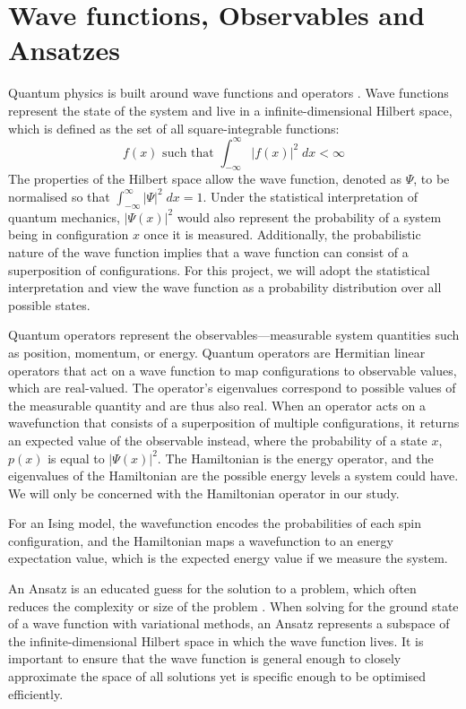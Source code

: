 \section{Wave functions, Observables and Ansatzes}\label{wavefunction}
Quantum physics is built around wave functions and operators \cite{GriffithsSchroeter2018}. Wave functions represent the state of the system and live in a infinite-dimensional Hilbert space, which is defined as the set of all square-integrable functions:
\begin{equation*}
    f(x) \text{ such that } \int_{-\infty}^\infty |f(x)|^2 \; dx < \infty
\end{equation*}
The properties of the Hilbert space allow the wave function, denoted as $\Psi$, to be normalised so that $\int_{-\infty}^\infty |\Psi|^2 \; dx = 1$. Under the statistical interpretation of quantum mechanics, $|\Psi(x)|^2$ would also represent the probability of a system being in configuration $x$ once it is measured. Additionally, the probabilistic nature of the wave function implies that a wave function can consist of a superposition of configurations. For this project, we will adopt the statistical interpretation and view the wave function as a probability distribution over all possible states.

Quantum operators represent the observables---measurable system quantities such as position, momentum, or energy. Quantum operators are Hermitian linear operators that act on a wave function to map configurations to observable values, which are real-valued. The operator's eigenvalues correspond to possible values of the measurable quantity and are thus also real. When an operator acts on a wavefunction that consists of a superposition of multiple configurations, it returns an expected value of the observable instead, where the probability of a state $x$, $p(x)$ is equal to $|\Psi (x)|^2$. The Hamiltonian is the energy operator, and the eigenvalues of the Hamiltonian are the possible energy levels a system could have. We will only be concerned with the Hamiltonian operator in our study.

For an Ising model, the wavefunction encodes the probabilities of each spin configuration, and the Hamiltonian maps a wavefunction to an energy expectation value, which is the expected energy value if we measure the system.

An Ansatz is an educated guess for the solution to a problem, which often reduces the complexity or size of the problem . When solving for the ground state of a wave function with variational methods, an Ansatz represents a subspace of the infinite-dimensional Hilbert space in which the wave function lives. It is important to ensure that the wave function is general enough to closely approximate the space of all solutions yet is specific enough to be optimised efficiently.

